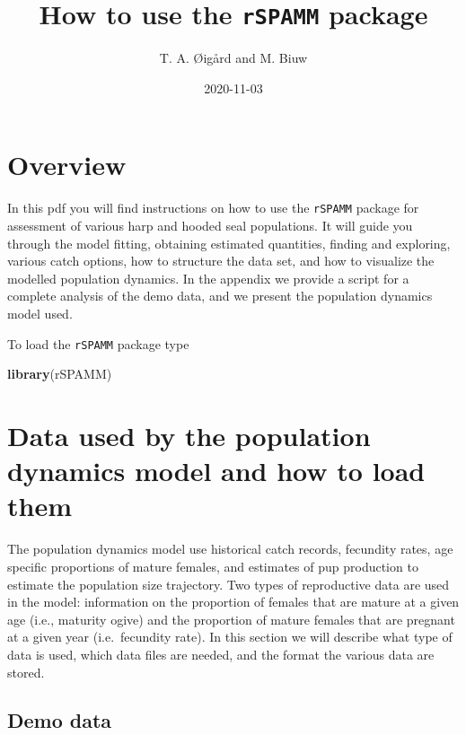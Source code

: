 \documentclass[
]{article}
\title{How to use the \texttt{rSPAMM} package}
\author{T. A. Øigård and M. Biuw}
\date{2020-11-03}
\newenvironment{Shaded}{\begin{snugshade}}{\end{snugshade}}
\newcommand{\KeywordTok}[1]{\textcolor[rgb]{0.13,0.29,0.53}{\textbf{#1}}}
\newcommand{\NormalTok}[1]{#1}
\begin{document}
\maketitle

\hypertarget{overview}{%
\section{Overview}\label{overview}}

In this pdf you will find instructions on how to use the \texttt{rSPAMM}
package for assessment of various harp and hooded seal populations. It
will guide you through the model fitting, obtaining estimated
quantities, finding and exploring, various catch options, how to
structure the data set, and how to visualize the modelled population
dynamics. In the appendix we provide a script for a complete analysis of
the demo data, and we present the population dynamics model used.

To load the \texttt{rSPAMM} package type

\begin{Shaded}
\begin{Highlighting}[]
\KeywordTok{library}\NormalTok{(rSPAMM)}
\end{Highlighting}
\end{Shaded}

\hypertarget{data-used-by-the-population-dynamics-model-and-how-to-load-them}{%
\section{Data used by the population dynamics model and how to load
them}\label{data-used-by-the-population-dynamics-model-and-how-to-load-them}}

The population dynamics model use historical catch records, fecundity
rates, age specific proportions of mature females, and estimates of pup
production to estimate the population size trajectory. Two types of
reproductive data are used in the model: information on the proportion
of females that are mature at a given age (i.e., maturity ogive) and the
proportion of mature females that are pregnant at a given year
(i.e.~fecundity rate). In this section we will describe what type of
data is used, which data files are needed, and the format the various
data are stored.

\hypertarget{demo-data}{%
\subsection{Demo data}\label{demo-data}}
\end{document}
